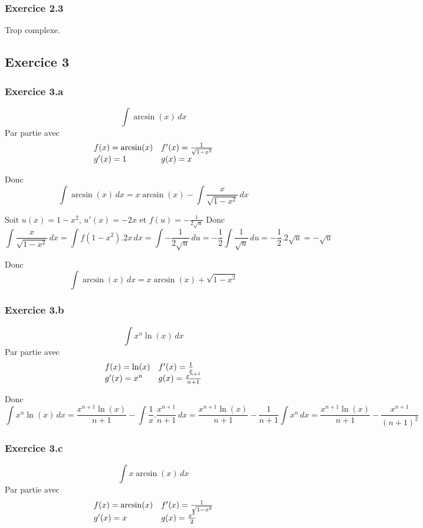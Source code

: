 \documentclass[]{book}
\theoremstyle{definition}
\begin{document}
\subsubsection*{Exercice 2.3}
Trop complexe.

\subsection*{Exercice 3}
\subsubsection*{Exercice 3.a}
$$\int{\arcsin(x)\,dx}$$
Par partie avec
$$
\begin{array}{l l}
f(x) = \arcsin(x) & f'(x)=\frac{1}{\sqrt{1-x^2}} \\
g'(x)= 1 & g(x) = x \\
\end{array}
$$

Donc
$$\int{\arcsin(x)\,dx} = x\arcsin(x) - \int{\frac{x}{\sqrt{1-x^2}}\,dx}$$

Soit $u(x)=1-x^2$, $u'(x)=-2x$ et $f(u)=-\frac{1}{2\sqrt{u}}$
Donc
$$\int{\frac{x}{\sqrt{1-x^2}}\,dx} = \int{f(1-x^2).2x\,dx} = \int{-\frac{1}{2\sqrt{u}}\,du} = -\frac{1}{2}\int{\frac{1}{\sqrt{u}}\,du} = -\frac{1}{2}.2\sqrt{u} = -\sqrt{u}$$

Donc
$$\int{\arcsin(x)\,dx} = x\arcsin(x) + \sqrt{1-x^2}$$

\subsubsection*{Exercice 3.b}
$$\int{x^n\ln(x)\,dx}$$
Par partie avec
$$
\begin{array}{l l}
f(x) = \ln(x) & f'(x)=\frac{1}{x} \\
g'(x)= x^n & g(x) = \frac{x^{n+1}}{n+1} \\
\end{array}
$$

Donc
$$\int{x^n\ln(x)\,dx} = \frac{x^{n+1}\ln(x)}{n+1} - \int{\frac{1}{x}.\frac{x^{n+1}}{n+1}\,dx} = \frac{x^{n+1}\ln(x)}{n+1} - \frac{1}{n+1}\int{x^n\,dx} = \frac{x^{n+1}\ln(x)}{n+1} - \frac{x^{n+1}}{(n+1)^2}$$


\subsubsection*{Exercice 3.c}
$$\int{x\arcsin(x)\,dx}$$
Par partie avec
$$
\begin{array}{l l}
f(x) = \arcsin(x) & f'(x)=\frac{1}{\sqrt{1-x^2}} \\
g'(x)= x & g(x) = \frac{x^{2}}{2} \\
\end{array}
$$
\end{document}
